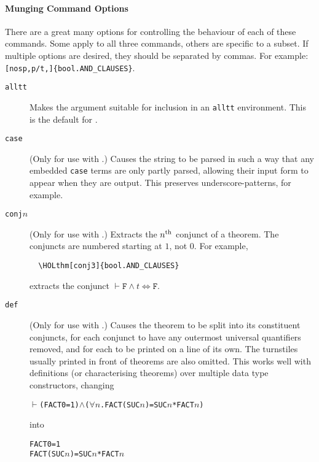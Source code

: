 \paragraph{Munging Command Options}
There are a great many options for controlling the behaviour of each of these commands.
%
Some apply to all three commands, others are specific to a subset.
%
\newcommand{\indentoption}{\gt\gt}
If multiple options are desired, they should be separated by commas. For example: \texttt{\holthm{}[nosp,p/t,\indentoption]\{bool.AND\_CLAUSES\}}.

\begin{description}
\item[\texttt{alltt}] Makes the argument suitable for inclusion in an \texttt{alltt} environment.
%
This is the default for \holthm.
\item[\texttt{case}] (Only for use with \holtm.)
%
Causes the string to be parsed in such a way that any embedded \texttt{case} terms are only partly parsed, allowing their input form to appear when they are output.
%
This preserves underscore-patterns, for example.

\item[\texttt{conj}$n$] (Only for use with \holthm.)
Extracts the $n^{\mbox{\scriptsize th}}$ conjunct of a theorem.
The conjuncts are numbered starting at $1$, not $0$.
For example,
\begin{verbatim}
  \HOLthm[conj3]{bool.AND_CLAUSES}
\end{verbatim}
extracts the conjunct $\vdash \texttt{F} \land t \iff \texttt{F}$.

\item[\texttt{def}] (Only for use with \holthm.)
%
Causes the theorem to be split into its constituent conjuncts, for each conjunct to have any outermost universal quantifiers removed, and for each to be printed on a line of its own.
%
The turnstiles usually printed in front of theorems are also omitted.
%
This works well with definitions (or characterising theorems) over multiple data type constructors, changing
\begin{alltt}
\(\vdash\) (FACT 0 = 1) \(\land\) (\(\forall\)\ensuremath{n}. FACT (SUC \ensuremath{n}) = SUC \ensuremath{n} * FACT \ensuremath{n})
\end{alltt}
into
\begin{alltt}
   FACT 0 = 1
   FACT (SUC \ensuremath{n}) = SUC \ensuremath{n} * FACT \ensuremath{n}
\end{alltt}


\end{description}
